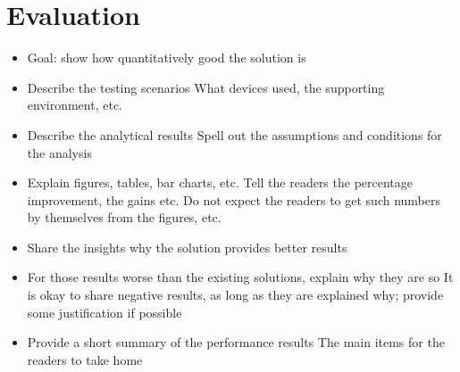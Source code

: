 \section{Evaluation}
\begin{itemize}
\item
Goal: show how quantitatively good the solution is
\item
Describe the testing scenarios
What devices used, the supporting environment, etc.
\item
Describe the analytical results
Spell out the assumptions and conditions for the analysis
\item
Explain figures, tables, bar charts, etc.
Tell the readers the percentage improvement, the gains etc. Do not expect the readers to get such numbers by themselves from the figures, etc.
\item
Share the insights why the solution provides better results
\item
For those results worse than the existing solutions, explain why they are so
It is okay to share negative results, as long as they are explained why; provide some justification if possible
\item
Provide a short summary of the performance results
The main items for the readers to take home
\end{itemize}